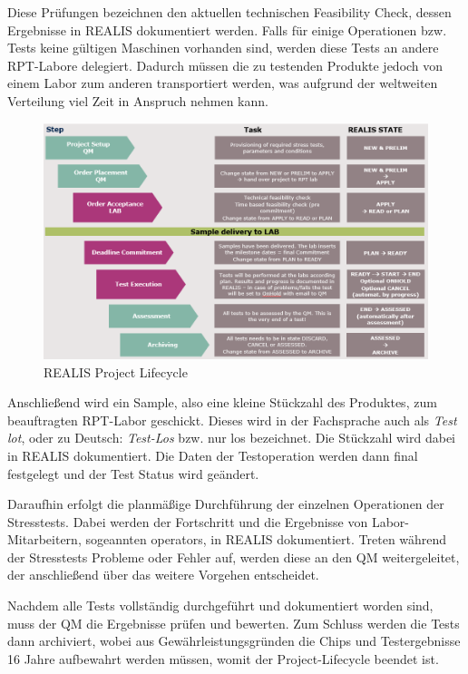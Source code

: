 Diese Prüfungen bezeichnen den aktuellen technischen Feasibility Check, dessen Ergebnisse in \gls{REALIS} dokumentiert werden.
Falls für einige Operationen bzw. Tests keine gültigen Maschinen vorhanden sind, werden diese Tests an andere \gls{RPT}-Labore delegiert. Dadurch müssen die zu testenden Produkte jedoch von einem Labor zum anderen transportiert werden, was aufgrund der weltweiten Verteilung viel Zeit in Anspruch nehmen kann.

\begin{figure}[!h]
    \centering
    \includegraphics[width=1\textwidth]{bilder/realis-project-lifecycle.png}
    \caption{REALIS Project Lifecycle \cite{REALISWikiIntern}}
    \label{fig:realis-project-lifecycle}
\end{figure}

Anschließend wird ein Sample, also eine kleine Stückzahl des Produktes, zum beauftragten \gls{RPT}-Labor geschickt. Dieses wird in der Fachsprache auch als \textit{Test lot}, oder zu Deutsch: \textit{Test-Los} bzw. nur \gls{los} bezeichnet. Die Stückzahl wird dabei in \gls{REALIS} dokumentiert. Die  Daten der Testoperation werden dann final festgelegt und der Test Status wird geändert.

Daraufhin erfolgt die planmäßige Durchführung der einzelnen Operationen der Stresstests. Dabei werden der Fortschritt und die Ergebnisse von Labor-Mitarbeitern, sogeannten \glspl{operator}, in \gls{REALIS} dokumentiert. Treten während der Stresstests Probleme oder Fehler auf, werden diese an den \gls{QM} weitergeleitet, der anschließend über das weitere Vorgehen entscheidet.

Nachdem alle Tests vollständig durchgeführt und dokumentiert worden sind, muss der \gls{QM} die Ergebnisse prüfen und bewerten. Zum Schluss werden die Tests dann archiviert, wobei aus Gewährleistungsgründen die Chips und Testergebnisse 16 Jahre aufbewahrt werden müssen, womit der Project-Lifecycle beendet ist.

